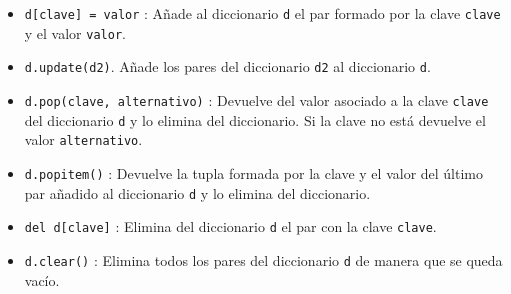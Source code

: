 \documentclass[
  spanish,
  a4paper,
]{scrreport}
\providecommand{\tightlist}{%
  \setlength{\itemsep}{0pt}\setlength{\parskip}{0pt}}
\begin{document}
\begin{itemize}
\tightlist
\item
  \texttt{d{[}clave{]}\ =\ valor} : Añade al diccionario \texttt{d} el
  par formado por la clave \texttt{clave} y el valor \texttt{valor}.
\item
  \texttt{d.update(d2)}. Añade los pares del diccionario \texttt{d2} al
  diccionario \texttt{d}.
\item
  \texttt{d.pop(clave,\ alternativo)} : Devuelve del valor asociado a la
  clave \texttt{clave} del diccionario \texttt{d} y lo elimina del
  diccionario. Si la clave no está devuelve el valor
  \texttt{alternativo}.
\item
  \texttt{d.popitem()} : Devuelve la tupla formada por la clave y el
  valor del último par añadido al diccionario \texttt{d} y lo elimina
  del diccionario.
\item
  \texttt{del\ d{[}clave{]}} : Elimina del diccionario \texttt{d} el par
  con la clave \texttt{clave}.
\item
  \texttt{d.clear()} : Elimina todos los pares del diccionario
  \texttt{d} de manera que se queda vacío.
\end{itemize}
\end{document}
